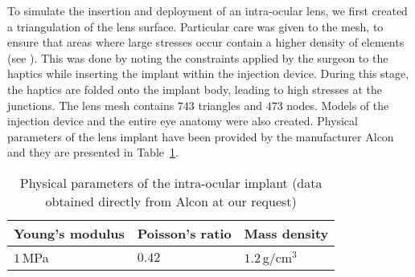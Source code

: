 To simulate the insertion and deployment of an intra-ocular lens, we first created a triangulation of the lens surface. Particular care was given to the mesh, to ensure that areas where large stresses occur contain a higher density of elements (see ). This was done by noting the constraints applied by the surgeon to the haptics while inserting the implant within the injection device. During this stage, the haptics are folded onto the implant body, leading to high stresses at the junctions. The lens mesh contains $743$ triangles and $473$ nodes. Models of the injection device and the entire eye anatomy were also created. Physical parameters of the lens implant have been provided by the manufacturer Alcon and they are presented in Table~\ref{chap8:tab-parameters}.
%
\begin{table}[ht]
	\begin{center}
		\begin{tabular}{|p{3cm}|p{3cm}|p{3cm}|}
		\hline
		 \centering Young's modulus & \centering Poisson's ratio & \centering Mass density \tabularnewline
		\hline
		\centering $1\,$MPa & \centering $0.42$ & \centering $1.2\,$g/cm$^3$ \tabularnewline
		\hline
		\end{tabular}
	\vspace{0.3cm}
	\caption[Physical parameters of the intra-ocular implant]{Physical parameters of the intra-ocular implant (data obtained directly from Alcon at our request)}
	\label{chap8:tab-parameters}
	\end{center}
\end{table}

